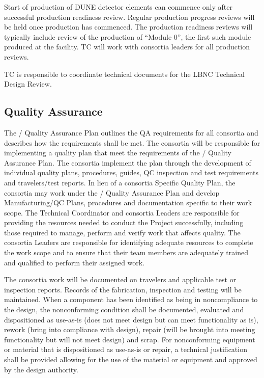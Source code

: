 Start of production of DUNE detector elements can commence only after
successful production readiness review. Regular production progress
reviews will be held once production has commenced. The production
readiness reviews will typically include review of the production of
``Module 0'', the first such module produced at the facility. TC will
work with consortia leaders for all production reviews.

TC is responsible to coordinate technical documents for the LBNC
Technical Design Review.

\subsection{Quality Assurance}
\label{sec:fdsp-coord-qa}


The / Quality Assurance Plan outlines the QA
requirements for all  consortia and describes how the
requirements shall be met. The consortia will be responsible for
implementing a quality plan that meet the requirements of the
/ Quality Assurance Plan.  The consortia
implement the plan through the development of individual quality
plans, procedures, guides, QC inspection and test requirements and
travelers/test reports.  In lieu of a consortia Specific Quality Plan,
the consortia may work under the / Quality
Assurance Plan and develop Manufacturing/QC Plans, procedures and
documentation specific to their work scope.  The 
Technical Coordinator and consortia Leaders are responsible for
providing the resources needed to conduct the Project successfully,
including those required to manage, perform and verify work that
affects quality.  The  consortia Leaders are responsible
for identifying adequate resources to complete the work scope and to
ensure that their team members are adequately trained and qualified to
perform their assigned work.

The consortia work will be documented on travelers and applicable test
or inspection reports. Records of the fabrication, inspection and
testing will be maintained. When a component has been identified as
being in noncompliance to the design, the nonconforming condition
shall be documented, evaluated and dispositioned as use-as-is (does
not meet design but can meet functionality as is), rework (bring into
compliance with design), repair (will be brought into meeting
functionality but will not meet design) and scrap. For nonconforming
equipment or material that is dispositioned as use-as-is or repair, a
technical justification shall be provided allowing for the use of the
material or equipment and approved by the design authority.

